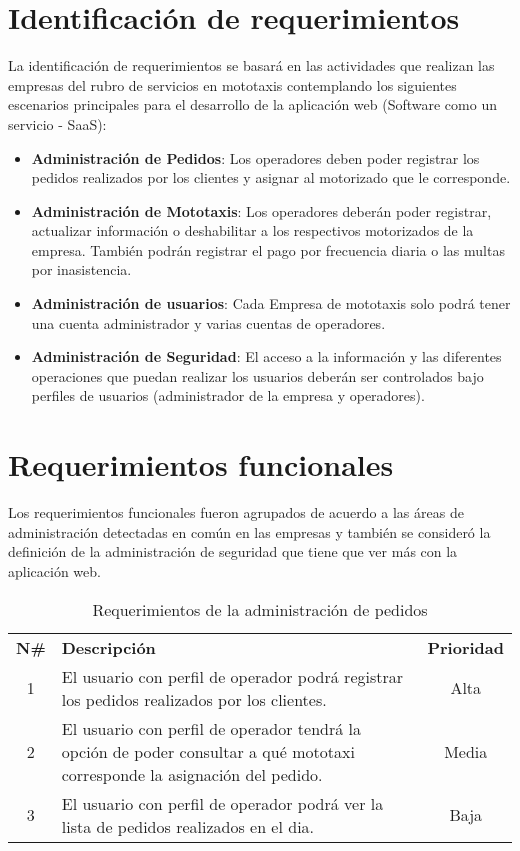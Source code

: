 \section{Identificación de requerimientos}
\noindent La identificación de requerimientos se basará en las actividades que realizan las empresas del rubro de servicios en mototaxis contemplando los siguientes escenarios principales para el desarrollo de la aplicación web (Software como un servicio - SaaS):
\begin{itemize}
\item \textbf{Administración de Pedidos}: Los operadores deben poder registrar los pedidos realizados por los clientes y asignar al motorizado que le corresponde.
\item \textbf {Administración de Mototaxis}: Los operadores deberán poder registrar, actualizar información o deshabilitar a los respectivos motorizados de la empresa. También podrán registrar el pago por frecuencia diaria o las multas por inasistencia.  
\item \textbf{Administración de usuarios}: Cada Empresa de mototaxis solo podrá tener una cuenta administrador y  varias cuentas de operadores.
\item \textbf{Administración de Seguridad}: El acceso a la información y las diferentes operaciones que puedan realizar los usuarios deberán ser controlados bajo perfiles de usuarios (administrador de la empresa y operadores).
\end{itemize}

\section{Requerimientos funcionales}

\noindent Los requerimientos funcionales fueron agrupados de acuerdo a las áreas de administración detectadas en común en las empresas y también se consideró la definición de la administración de seguridad que tiene que ver más con la aplicación web.

\begin{table}[H]
	\centering
    \begin{tabular}{ |c|p{10cm}|c| }
	  \hline
	  \rowcolor{indigo-dark} \multicolumn{3}{|c|}{ \textcolor{white}{\textbf{Administración de Pedidos}}} \\
	  \hline
	  \rowcolor{indigo-light} \textbf{N\#} & \centering \textbf{Descripción} & \textbf{Prioridad} \\
	  \hline
	  1 & El usuario con perfil de operador podrá registrar los pedidos realizados por los clientes. & Alta\\
	  \hline
	  2 & El usuario con perfil de operador tendrá la opción de poder consultar a qué mototaxi corresponde la asignación del pedido. & Media \\
	  \hline
	  3 & El usuario con perfil de operador podrá ver la lista de pedidos realizados en el dia.   & Baja \\
	  \hline
	\end{tabular}
	\caption{Requerimientos de la administración de pedidos}
\end{table}

